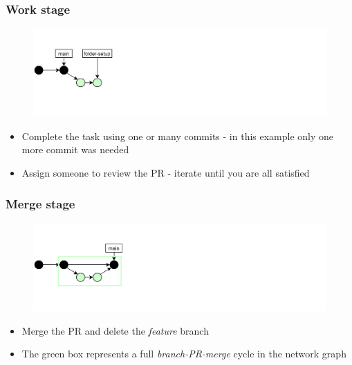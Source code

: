 \documentclass[aspectratio=169]{beamer} %
\begin{document}
\begin{frame}
	\frametitle{Work stage}

	\vspace{-.5cm}
	\begin{minipage}[t][5cm][t]{\textwidth}
		\begin{figure}
			\centering
			\includegraphics[width=\textwidth]{./img/dime-gitflow-network-1-2.png}
		\end{figure}
	\end{minipage}

	\vspace{-.5cm}
	\begin{minipage}[t][5cm][t]{\textwidth}
		\begin{itemize}
			\setlength\itemsep{.5em}
			\item Complete the task using one or many commits
			- in this example only one more commit was needed
			\item Assign someone to review the PR
			- iterate until you are all satisfied
		\end{itemize}
	\end{minipage}

\end{frame}

\begin{frame}
	\frametitle{Merge stage}

	\vspace{-.5cm}
	\begin{minipage}[t][5cm][t]{\textwidth}
		\begin{figure}
			\centering
			\includegraphics[width=\textwidth]{./img/dime-gitflow-network-1-3.png}
		\end{figure}
	\end{minipage}

	\vspace{-.5cm}
	\begin{minipage}[t][5cm][t]{\textwidth}
		\begin{itemize}
			\setlength\itemsep{.5em}
			\item Merge the PR and delete the \textit{feature} branch
			\item The green box represents
			a full \textit{branch-PR-merge} cycle in the network graph
		\end{itemize}
	\end{minipage}

\end{frame}
\end{document}
